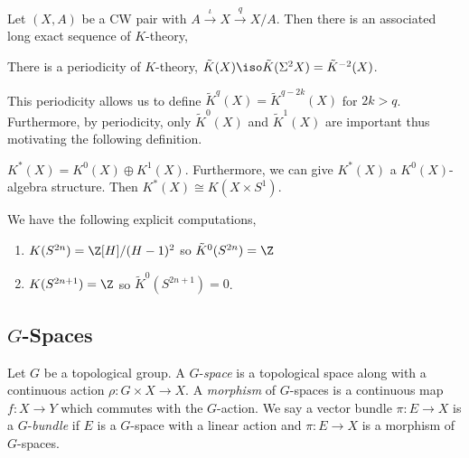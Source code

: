 \documentclass[12pt]{extarticle}
\begin{document}
\begin{prop}
Let $(X, A)$ be a CW pair with $A \xrightarrow{\iota} X \xrightarrow{q} X/A$. Then there is an associated long exact sequence of $K$-theory,
\begin{center}
\end{center}
\end{prop}

\begin{theorem}[Bott]
There is a periodicity of $K$-theory, $\tilde{K}(X) \iso \tilde{K}(\Sigma^2 X) = \tilde{K}^{-2}(X)$.
\end{theorem}

\begin{rmk}
This periodicity allows us to define $\tilde{K}^q(X) = \tilde{K}^{q - 2k}(X)$ for $2k > q$. Furthermore, by periodicity, only $\tilde{K}^0(X)$ and $\tilde{K}^1(X)$ are important thus motivating the following definition.
\end{rmk}

\begin{defn}
$K^*(X) = K^0(X) \oplus K^1(X)$. Furthermore, we can give $K^*(X)$ a $K^0(X)$-algebra structure. Then $K^*(X) \cong K(X \times S^1)$.
\end{defn}

\begin{prop}
We have the following explicit computations,
\begin{enumerate}
\item $K(S^{2n}) = \Z[H]/(H - 1)^2$ so $\tilde{K}^0(S^{2n}) = \Z$ 
\item $K(S^{2n + 1}) = \Z$ so $\tilde{K}^0(S^{2n + 1}) = 0$.
\end{enumerate}
\end{prop}

\subsection{$G$-Spaces}

\begin{defn}
Let $G$ be a topological group. A $G$-\textit{space} is a topological space along with a continuous action $\rho : G \times X \to X$. A \textit{morphism} of $G$-spaces is a continuous map $f : X \to Y$ which commutes with the $G$-action. We say a vector bundle $\pi : E \to X$ is a $G$-\textit{bundle} if $E$ is a $G$-space with a linear action and $\pi : E \to X$ is a morphism of $G$-spaces.
\end{defn}
\end{document}
